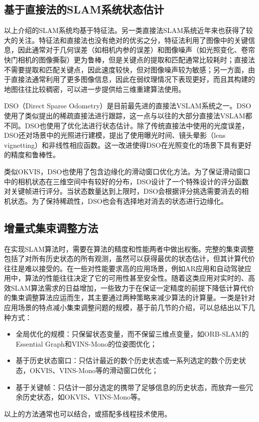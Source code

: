 \subsection{基于直接法的SLAM系统状态估计}

以上介绍的SLAM系统均基于特征法。另一类直接法SLAM系统近年来也获得了较大的关注。特征法和直接法也没有绝对的优劣之分，特征法利用了图像中的关键信息，因此通常对于几何误差（如相机内参的误差）和图像噪声（如光照变化、卷帘快门相机的图像撕裂）更为鲁棒，但是关键点的提取和匹配通常比较耗时；直接法不需要提取和匹配关键点，因此速度较快，但对图像噪声较为敏感；另一方面，由于直接法通常利用了更多图像信息，因此在弱纹理情况下表现更好，而且其构建的地图往往比较稠密，可以进一步提供给三维重建算法使用。

DSO（Direct Sparse Odometry）\citep{engel2018direct}是目前最先进的直接法VSLAM系统之一。DSO使用了类似\citep{jin2003semi}提出的稀疏直接法进行跟踪，这一点与以往的大部分直接法VSLAM都不同。DSO也使用了优化法进行状态估计。除了传统直接法中使用的光度误差，DSO还对场景中的光照进行建模，提出了使用曝光时间、镜头晕影（lens vignetting）和非线性相应函数。这一改进使得DSO在光照变化的场景下具有更好的精度和鲁棒性。

类似OKVIS，DSO也使用了包含边缘化的滑动窗口优化方法。为了保证滑动窗口中的相机状态在三维空间中有较好的分布，DSO设计了一个特殊设计的评分函数对关键帧进行评分。当状态数量达到上限时，DSO会根据评分挑选需要消去的相机状态。为了保持稀疏性，DSO也会有选择地对消去的状态进行边缘化。

\subsection{增量式集束调整方法}

在实现SLAM算法时，需要在算法的精度和性能两者中做出权衡。完整的集束调整包括了对所有历史状态的所有观测，虽然可以获得最优的状态估计，但其计算代价往往是难以接受的。在一些对性能要求高的应用场景，例如AR应用和自动驾驶应用中，算法的性能往往决定了它的可用性甚至安全性。随着这类应用对实时的、高效SLAM算法需求的日益增加，一些致力于在保证一定精度的前提下降低计算代价的集束调整算法应运而生，其主要通过两种策略来减少算法的计算量。一类是针对应用场景的特点减小集束调整问题的规模，基于前几节的介绍，可以总结出以下几种方式：
\begin{itemize}
    \item 全局优化的规模：只保留状态变量，而不保留三维点变量，如ORB-SLAM的Essential Graph和VINS-Mono的位姿图优化；
    \item 基于历史状态窗口：只估计最近的数个历史状态或一系列选定的数个历史状态，OKVIS、VINS-Mono等的滑动窗口优化；
    \item 基于关键帧：只估计一部分选定的携带了足够信息的历史状态，而放弃一些冗余历史状态，如OKVIS、VINS-Mono等。
\end{itemize}
以上的方法通常也可以结合，或搭配多线程技术使用。

